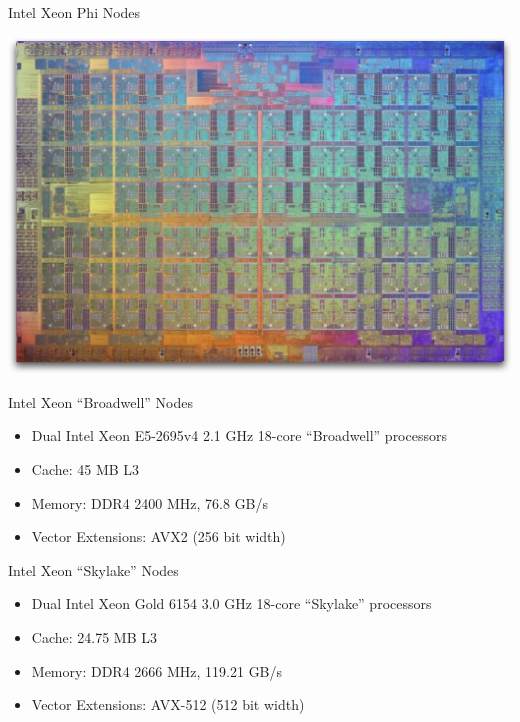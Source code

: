 \begin{frame}{Intel Xeon Phi Nodes}
\begin{center}
\includegraphics[height=0.75\textheight]{figures/mic_die_shot.jpg}
\end{center}
\end{frame}

\begin{frame}{Intel Xeon “Broadwell” Nodes}
\begin{itemize}
\item Dual Intel Xeon E5-2695v4 2.1 GHz 18-core ``Broadwell'' processors
\item Cache: 45 MB L3
\item Memory: DDR4 2400 MHz, 76.8 GB/s
\item Vector Extensions: AVX2 (256 bit width)
\end{itemize}
\end{frame}

\begin{frame}{Intel Xeon “Skylake” Nodes}
\begin{itemize}
\item Dual Intel Xeon Gold 6154 3.0 GHz 18-core ``Skylake'' processors
\item Cache: 24.75 MB L3
\item Memory: DDR4 2666 MHz, 119.21 GB/s
\item Vector Extensions: AVX-512 (512 bit width)
\end{itemize}
\end{frame}

